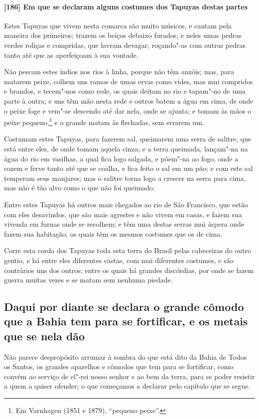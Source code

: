 \begin{linenumbers}
\paragraph{[186] Em que se declaram alguns costumes dos Tapuyas destas partes}\quad
Estes Tapuyas que vivem nesta comarca são muito músicos, e cantam pela maneira dos
primeiros; trazem os beiços debaixo furados, e neles umas pedras verdes roliças e
compridas, que lavram devagar, roçando"-as com outras pedras tanto até que as aperfeiçoam à
sua vontade.

Não pescam estes índios nos rios à linha, porque não têm anzóis; mas, para matarem peixe,
colhem uns ramos de umas ervas como vides, mas mui compridos e brandos, e tecem"-nos como
rede, os quais deitam no rio e tapam"-no de uma parte à outra; e uns têm mão nesta rede e
outros batem a água em cima, de onde o peixe foge e vem"-se descendo até dar nela, onde se
ajunta; e tomam às mãos o peixe pequeno,\footnote{ Em Varnhagen (1851 e 1879), ``pequeno
peixe''.} e o grande matam às flechadas, sem errarem um.

Costumam estes Tapuyas, para fazerem sal, queimarem uma serra de salitre, que está entre
eles, de onde tomam aquela cinza; e a terra queimada, lançam"-na na água do rio em
vasilhas, a qual fica logo salgada, e põem"-na ao fogo, onde a cozem e ferve tanto até que
se coalha, e fica feito o sal em um pão; e com este sal temperam seus manjares; mas o
salitre torna logo a crescer na serra para cima, mas não é tão alvo como o que não foi
queimado.

Entre estes Tapuyas há outros mais chegados ao rio de São Francisco, que estão com eles
desavindos, que são mais agrestes e não vivem em casas, e fazem sua vivenda em furnas onde
se recolhem; e têm uma destas serras mui áspera onde fazem sua habitação; os quais têm os
mesmos costumes que os de cima.

Corre esta corda dos Tapuyas toda esta terra do Brasil pelas cabeceiras do outro gentio, e
há entre eles diferentes castas, com mui diferentes costumes, e são contrários uns dos
outros; entre os quais há grandes discórdias, por onde se fazem guerra muitas vezes e se
matam sem nenhuma piedade.

\subsection{Daqui por diante se declara o grande cômodo que a Bahia tem para se
fortificar, e os metais que se nela dão}

Não parece despropósito arrumar à sombra do que está dito da Bahia de Todos os Santos, os
grandes aparelhos e cômodos que tem para se fortificar, como convém ao serviço de el"-rei
nosso senhor e ao bem da terra, para se poder resistir a quem a quiser ofender; o que
começamos a declarar pelo capítulo que se segue.


\end{linenumbers}
